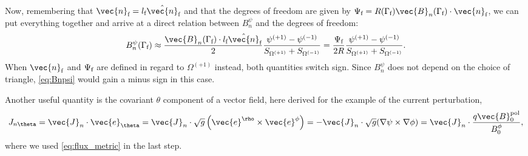 Now, remembering that $\vec{n}_{\fs} = l_{\fs} \hat{\vec{n}}_{\fs}$ and that the degrees of freedom are given by $\Psi_{\fs} = R (\Gamma_{\fs}) \vec{B}_{n} (\Gamma_{\fs}) \cdot \vec{n}_{\fs}$, we can put everything together and arrive at a direct relation between $B_{n}^{\psi}$ and the degrees of freedom:
\begin{gather}
  B_{n}^{\psi} (\Gamma_{\fs}) \approx \frac{\vec{B}_{n} (\Gamma_{\fs}) \cdot l_{\fs} \hat{\vec{n}}_{\fs}}{2} \frac{\psi^{(+1)} - \psi^{(-1)}}{S_{\Omega^{(+1)}} + S_{\Omega^{(-1)}}} = \frac{\Psi_{\fs}}{2 R} \frac{\psi^{(+1)} - \psi^{(-1)}}{S_{\Omega^{(+1)}} + S_{\Omega^{(-1)}}}. \label{eq:Bnpsi}
\end{gather}
When $\vec{n}_{\fs}$ and $\Psi_{\textrm{f}}$ are defined in regard to $\Omega^{(+1)}$ instead, both quantities switch sign. Since $B_{n}^{\psi}$ does not depend on the choice of triangle, \cref{eq:Bnpsi} would gain a minus sign in this case.

Another useful quantity is the covariant $\theta$ component of a vector field, here derived for the example of the current perturbation,
\begin{gather}
  J_{n \theta} = \vec{J}_{n} \cdot \vec{e}_{\theta} = \vec{J}_{n} \cdot \sqrt{g} \left ( \vec{e}^{\rho} \times \vec{e}^{\phi} \right ) = -\vec{J}_{n} \cdot \sqrt{g} (\grad \psi \times \grad \phi) = \vec{J}_{n} \cdot \frac{q \vec{B}_{0}^{\pol}}{B_{0}^{\phi}},
\end{gather}
where we used \cref{eq:flux_metric} in the last step.

